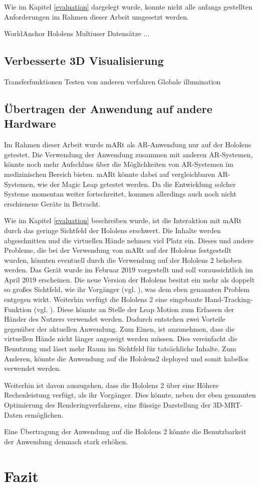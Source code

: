 Wie im Kapitel \ref{evaluation} dargelegt wurde, konnte nicht alle anfangs gestellten Anforderungen im Rahmen dieser Arbeit umgesetzt werden. 

WorldAnchor Hololens
Multiuser
Datensätze
...

\subsection{Verbesserte 3D Visualisierung}
Transferfunktionen
Testen von anderen verfahren
Globale illumination

\subsection{Übertragen der Anwendung auf andere Hardware}

Im Rahmen dieser Arbeit wurde mARt als AR-Anwendung nur auf der Hololens getestet. 
Die Verwendung der Anwendung zusammen mit anderen AR-Systemen, könnte noch mehr Aufschluss über die Möglichkeiten von AR-Systemen im medizinischen Bereich bieten. 
mARt könnte dabei auf vergleichbaren AR-Systemen, wie der Magic Leap getestet werden.
Da die Entwicklung solcher Systeme momentan weiter fortschreitet, kommen allerdings auch noch nicht erschienene Geräte in Betracht.

Wie im Kapitel \ref{evaluation} beschreiben wurde, ist die Interaktion mit mARt durch das geringe Sichtfeld der Hololens erschwert. Die Inhalte werden abgeschnitten und die virtuellen Hände nehmen viel Platz ein. 
Dieses und andere Probleme, die bei der Verwendung von mARt auf der Hololens festgestellt wurden, könnten eventuell durch die Verwendung auf der Hololens 2 behoben werden. 
Das Gerät wurde im Februar 2019 vorgestellt und soll voraussichtlich im April 2019 erscheinen. 
Die neue Version der Hololens besitzt ein mehr als doppelt so großes Sichtfeld, wie ihr Vorgänger (vgl. \citet{hololens2}), was dem eben genannten Problem entgegen wirkt. 
Weiterhin verfügt die Hololens 2 eine eingebaute Hand-Tracking-Funktion (vgl. \citet{hololens2}). Diese könnte an Stelle der Leap Motion zum Erfassen der Händer des Nutzers verwendet werden. Dadurch entstehen zwei Vorteile gegenüber der aktuellen Anwendung. Zum Einen, ist anzunehmen, dass die virtuellen Hände nicht länger angezeigt werden müssen. Dies vereinfacht die Benutzung und lässt mehr Raum im Sichtfeld für tatsächliche Inhalte. Zum Anderen, könnte die Anwendung auf die Hololens2 deployed und somit kabellos verwendet werden. 

Weiterhin ist davon auszugehen, dass die Hololens 2 über eine Höhere Rechenleistung verfügt, als ihr Vorgänger. Dies könnte, neben der eben genannten Optimierung des Renderingverfahrens, eine flüssige Darstellung der 3D-MRT-Daten ermöglichen.

Eine Übertragung der Anwendung auf die Hololens 2 könnte die Benutzbarkeit der Anwendung demnach stark erhöhen.


\section{Fazit}
